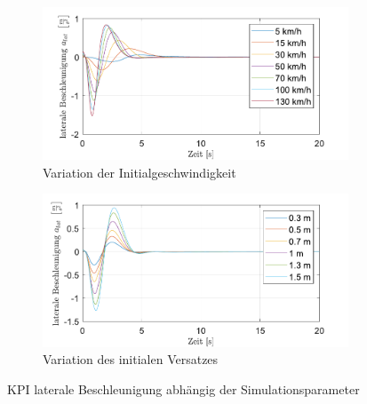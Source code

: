 \begin{figure}
    \centering
    \begin{subfigure}[b]{.49\textwidth}
        \centering
        \includegraphics[width=\textwidth]{figures/3_Implementierung/Straight_Offset/varVelo_1mOffset_a-Lat.pdf}
        \caption{Variation der Initialgeschwindigkeit}
        \label{fig:varVelo_1mOffset_a-Lat}
    \end{subfigure}
    \hfill
    \begin{subfigure}[b]{.49\textwidth}
        \centering
        \includegraphics[width=\textwidth]{figures/3_Implementierung/Straight_Offset/varOffset_50kmh_a-Lat.pdf}
        \caption{Variation des initialen Versatzes}
        \label{fig:varOffset_50kmh_a-Lat}
    \end{subfigure}
    \caption{KPI laterale Beschleunigung abhängig der Simulationsparameter}
    \label{fig:Straight_Offset_a-Lat}
\end{figure}

